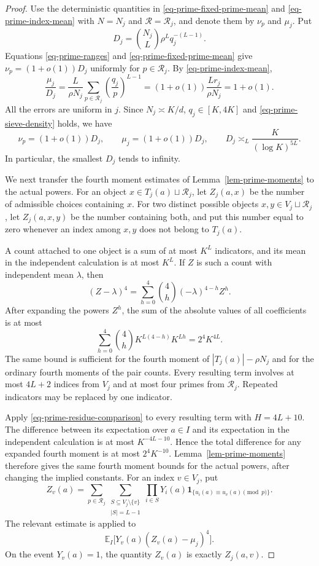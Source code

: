 \documentclass[11pt,reqno]{amsart}
\numberwithin{equation}{section}
\begin{document}
\begin{proof}
Use the deterministic quantities in \eqref{eq-prime-fixed-prime-mean} and \eqref{eq-prime-index-mean} with $N=N_j$ and $\mathcal R=\mathcal R_j$, and denote them by $\nu_p$ and $\mu_j$. Put
\[
 D_j=\binom{N_j}{L}\rho^L q_j^{-(L-1)}.
\]
Equations \eqref{eq-prime-ranges} and \eqref{eq-prime-fixed-prime-mean} give $\nu_p=(1+o(1))D_j$ uniformly for $p\in\mathcal R_j$. By \eqref{eq-prime-index-mean},
\[
 \frac{\mu_j}{D_j}
 =\frac{L}{\rho N_j}
   \sum_{p\in\mathcal R_j}\left(\frac{q_j}{p}\right)^{L-1}
 =(1+o(1))\frac{Lr_j}{\rho N_j}
 =1+o(1).
\]
All the errors are uniform in $j$. Since $N_j\asymp K/d$, $q_j\in[K,4K]$ and \eqref{eq-prime-sieve-density} holds, we have
\begin{equation}\label{eq-prime-common-counts}
 \nu_p=(1+o(1))D_j,
 \qquad
 \mu_j=(1+o(1))D_j,
 \qquad
 D_j\asymp_L\frac K{(\log K)^{5L}}.
\end{equation}
In particular, the smallest $D_j$ tends to infinity.

We next transfer the fourth moment estimates of Lemma~\ref{lem-prime-moments} to the actual powers. For an object $x\in T_j(a)\sqcup\mathcal R_j$, let $Z_j(a,x)$ be the number of admissible choices containing $x$. For two distinct possible objects $x,y\in V_j\sqcup\mathcal R_j$, let $Z_j(a,x,y)$ be the number containing both, and put this number equal to zero whenever an index among $x,y$ does not belong to $T_j(a)$.

A count attached to one object is a sum of at most $K^L$ indicators, and its mean in the independent calculation is at most $K^L$. If $Z$ is such a count with independent mean $\lambda$, then
\[
 (Z-\lambda)^4=\sum_{h=0}^4\binom4h(-\lambda)^{4-h}Z^h.
\]
After expanding the powers $Z^h$, the sum of the absolute values of all coefficients is at most
\[
 \sum_{h=0}^4\binom4hK^{L(4-h)}K^{Lh}
 =2^4K^{4L}.
\]
The same bound is sufficient for the fourth moment of $|T_j(a)|-\rho N_j$ and for the ordinary fourth moments of the pair counts. Every resulting term involves at most $4L+2$ indices from $V_j$ and at most four primes from $\mathcal R_j$. Repeated indicators may be replaced by one indicator.

Apply \eqref{eq-prime-residue-comparison} to every resulting term with $H=4L+10$. The difference between its expectation over $a\in I$ and its expectation in the independent calculation is at most $K^{-4L-10}$. Hence the total difference for any expanded fourth moment is at most $2^4K^{-10}$. Lemma~\ref{lem-prime-moments} therefore gives the same fourth moment bounds for the actual powers, after changing the implied constants. For an index $v\in V_j$, put
\[
 Z_v(a)=\sum_{p\in\mathcal R_j}
      \sum_{\substack{S\subseteq V_j\setminus\{v\}\\|S|=L-1}}
      \prod_{i\in S}Y_i(a)
      \mathbf1_{\{u_i(a)\equiv u_v(a)\pmod p\}}.
\]
The relevant estimate is applied to
\[
 \mathbb E_I\bigl[Y_v(a)(Z_v(a)-\mu_j)^4\bigr].
\]
On the event $Y_v(a)=1$, the quantity $Z_v(a)$ is exactly $Z_j(a,v)$.


\end{proof}
\end{document}
